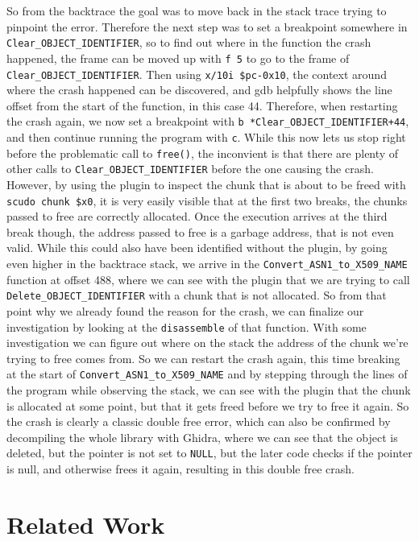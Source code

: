 \documentclass[a4paper,11pt,oneside]{report}
\begin{document}
So from the backtrace the goal was to move back in the stack trace trying to
pinpoint the error. Therefore the next step was to set a breakpoint somewhere
in \verb|Clear_OBJECT_IDENTIFIER|, so to find out where in the function the
crash happened, the frame can be moved up with \verb|f 5| to go to the frame
of \verb|Clear_OBJECT_IDENTIFIER|. Then using \verb|x/10i $pc-0x10|, the
context around where the crash happened can be discovered, and gdb helpfully
shows the line offset from the start of the function, in this case 44.
Therefore, when restarting the crash again, we now set a breakpoint with
\verb|b *Clear_OBJECT_IDENTIFIER+44|, and then continue running the program
with \verb|c|. While this now lets us stop right before the problematic call
to \verb|free()|, the inconvient is that there are plenty of other calls to
\verb|Clear_OBJECT_IDENTIFIER| before the one causing the crash. However, by
using the plugin to inspect the chunk that is about to be freed with
\verb|scudo chunk $x0|, it is very easily visible that at the first two breaks,
the chunks passed to free are correctly allocated. Once the execution arrives
at the third break though, the address passed to free is a garbage address,
that is not even valid.
While this could also have been identified without the plugin, by going even
higher in the backtrace stack, we arrive in the \verb|Convert_ASN1_to_X509_NAME|
function at offset 488, where we can see with the plugin that we are trying
to call \verb|Delete_OBJECT_IDENTIFIER| with a chunk that is not allocated.
So from that point why we already found the reason for the crash, we can
finalize our investigation by looking at the \verb|disassemble| of that
function. With some investigation we can figure out where on the stack the
address of the chunk we're trying to free comes from. So we can restart the
crash again, this time breaking at the start of \verb|Convert_ASN1_to_X509_NAME|
and by stepping through the lines of the program while observing the stack,
we can see with the plugin that the chunk is allocated at some point, but
that it gets freed before we try to free it again. So the crash is clearly
a classic double free error, which can also be confirmed by decompiling the
whole library with Ghidra, where we can see that the object is deleted, but
the pointer is not set to \verb|NULL|, but the later code checks if the
pointer is null, and otherwise frees it again, resulting in this double free
crash.


\chapter{Related Work}
\end{document}
